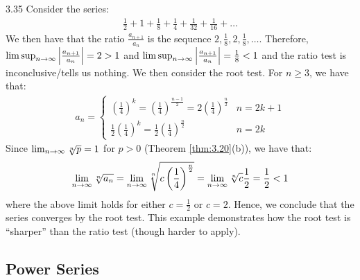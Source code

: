 \begin{example}{}{3.35}
    Consider the series:
    \begin{align*}
        \frac{1}{2} + 1 + \frac{1}{8} + \frac{1}{4} + \frac{1}{32} + \frac{1}{16} + \ldots
    \end{align*}
    We then have that the ratio $\frac{a_{n+1}}{a_n}$ is the sequence $2, \frac{1}{8}, 2, \frac{1}{8}, \ldots$. Therefore, $\limsup_{n \rightarrow \infty} \abs{\frac{a_{n+1}}{a_n}} = 2 > 1$ and $\limsup_{n \rightarrow \infty} \abs{\frac{a_{n+1}}{a_n}} = \frac{1}{8} < 1$ and the ratio test is inconclusive/tells us nothing. We then consider the root test. For $n \geq 3$, we have that:
    \begin{align*}
        a_n = \begin{cases}
            \left(\frac{1}{4}\right)^k = \left(\frac{1}{4}\right)^{\frac{n-1}{2}} = 2\left(\frac{1}{4}\right)^{\frac{n}{2}} & n = 2k + 1
            \\ \frac{1}{2}\left(\frac{1}{4}\right)^{k} = \frac{1}{2}\left(\frac{1}{4}\right)^{\frac{n}{2}} & n = 2k
        \end{cases}
    \end{align*}
    Since $\lim_{n \rightarrow \infty} \sqrt[n]{p} = 1$ for $p > 0$ (Theorem \ref{thm:3.20}(b)), we have that:
    \begin{align*}
        \lim_{n \rightarrow \infty} \sqrt[n]{a_n} = \lim_{n \rightarrow \infty} \sqrt[n]{c\left(\frac{1}{4}\right)^{\frac{n}{2}}} = \lim_{n \rightarrow \infty} \sqrt[n]{c} \frac{1}{2} = \frac{1}{2} < 1
    \end{align*}
    where the above limit holds for either $c = \frac{1}{2}$ or $c = 2$. Hence, we conclude that the series converges by the root test. This example demonstrates how the root test is ``sharper'' than the ratio test (though harder to apply).
\end{example}
\subsection{Power Series}

